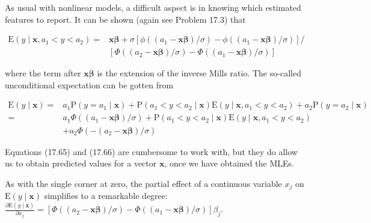 \documentclass[10pt]{article}
\begin{document}
As usual with nonlinear models, a difficult aspect is in knowing which estimated features to report. It can be shown (again see Problem 17.3) that


\begin{align*}
\mathrm{E}\left(y \mid \mathbf{x}, a_{1}<y<a_{2}\right)= & \mathbf{x} \boldsymbol{\beta}+\sigma\left[\phi\left(\left(a_{1}-\mathbf{x} \boldsymbol{\beta}\right) / \sigma\right)-\phi\left(\left(a_{1}-\mathbf{x} \boldsymbol{\beta}\right) / \sigma\right)\right] / \\
& {\left[\Phi\left(\left(a_{2}-\mathbf{x} \boldsymbol{\beta}\right) / \sigma\right)-\Phi\left(\left(a_{1}-\mathbf{x} \boldsymbol{\beta}\right) / \sigma\right)\right] } \tag{17.65}
\end{align*}


where the term after $\mathbf{x} \boldsymbol{\beta}$ is the extension of the inverse Mills ratio. The so-called unconditional expectation can be gotten from


\begin{align*}
\mathrm{E}(y \mid \mathbf{x})= & a_{1} \mathrm{P}\left(y=a_{1} \mid \mathbf{x}\right)+\mathrm{P}\left(a_{1}<y<a_{2} \mid \mathbf{x}\right) \mathrm{E}\left(y \mid \mathbf{x}, a_{1}<y<a_{2}\right)+a_{2} \mathrm{P}\left(y=a_{2} \mid \mathbf{x}\right) \\
= & a_{1} \Phi\left(\left(a_{1}-\mathbf{x} \boldsymbol{\beta}\right) / \sigma\right)+\mathrm{P}\left(a_{1}<y<a_{2} \mid \mathbf{x}\right) \mathrm{E}\left(y \mid \mathbf{x}, a_{1}<y<a_{2}\right) \\
& +a_{2} \Phi\left(-\left(a_{2}-\mathbf{x} \boldsymbol{\beta}\right) / \sigma\right) \tag{17.66}
\end{align*}


Equations (17.65) and (17.66) are cumbersome to work with, but they do allow us to obtain predicted values for a vector $\mathbf{x}$, once we have obtained the MLEs.

As with the single corner at zero, the partial effect of a continuous variable $x_{j}$ on $\mathrm{E}(y \mid \mathbf{x})$ simplifies to a remarkable degree:\\
$\frac{\partial \mathrm{E}(y \mid \mathbf{x})}{\partial x_{j}}=\left[\Phi\left(\left(a_{2}-\mathbf{x} \boldsymbol{\beta}\right) / \sigma\right)-\Phi\left(\left(a_{1}-\mathbf{x} \boldsymbol{\beta}\right) / \sigma\right)\right] \beta_{j}$.
\end{document}

